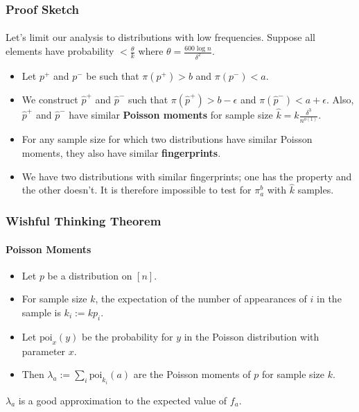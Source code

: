 \documentclass{beamer}
\begin{document}
\begin{frame}
  \frametitle{Proof Sketch} \framesubtitle{}

  Let's limit our analysis to distributions with low frequencies.
  Suppose all elements have probability $<\frac{\theta}{k}$ where
  $\theta=\frac{600\log n}{\delta^2}$.
  \begin{itemize}
  \item Let $p^+$ and $p^-$ be such that $\pi(p^+)>b$ and
    $\pi(p^-)<a$.
  \item We construct $\hat{p}^+$ and $\hat{p}^-$ such that
    $\pi(\hat{p}^+)>b-\epsilon$ and $\pi(\hat{p}^-)<a+\epsilon$. Also,
    $\hat{p}^+$ and $\hat{p}^-$ have similar {\bf Poisson moments} for
    sample size $\hat{k}=k\frac{\delta^3}{n^{o(1)}}$.
  \item For any sample size for which two distributions have similar
    Poisson moments, they also have similar {\bf fingerprints}.
  \item We have two distributions with similar fingerprints; one has
    the property and the other doesn't. It is therefore impossible to
    test for $\pi_a^b$ with $\hat{k}$ samples.
  \end{itemize}

\end{frame}


\begin{frame}
  \frametitle{Wishful Thinking Theorem} \framesubtitle{Poisson
    Moments}

  \begin{itemize}
  \item Let $p$ be a distribution on $[n]$.
  \item For sample size $k$, the expectation of the number of
    appearances of $i$ in the sample is $k_i:=kp_i$.
  \item Let $\mbox{poi}_x(y)$ be the probability for $y$ in the
    Poisson distribution with parameter $x$.
  \item  Then $\lambda_a:=\sum_i\mbox{poi}_{k_i}(a)$ are the
    Poisson moments of $p$ for sample size $k$.
  \end{itemize}
  $\lambda_a$ is a good approximation to the expected value of $f_a$.
\end{frame}
\end{document}
